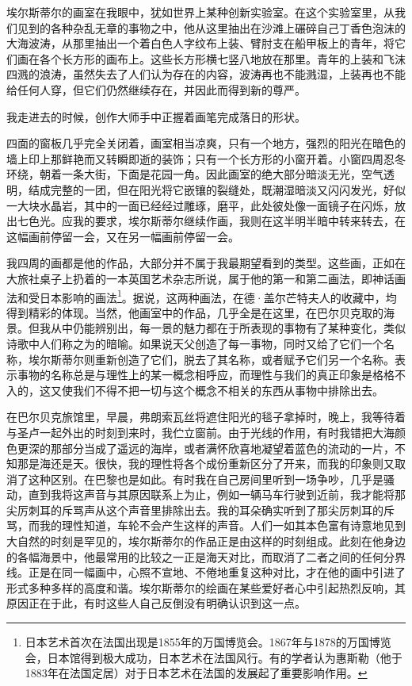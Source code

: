 \par 埃尔斯蒂尔的画室在我眼中，犹如世界上某种创新实验室。在这个实验室里，从我们见到的各种杂乱无章的事物之中，他从这里抽出在沙滩上碾碎自己丁香色泡沫的大海波涛，从那里抽出一个着白色人字纹布上装、臂肘支在船甲板上的青年，将它们画在各个长方形的画布上。这些长方形横七竖八地放在那里。青年的上装和飞沫四溅的浪涛，虽然失去了人们认为存在的内容，波涛再也不能溅湿，上装再也不能给任何人穿，但它们仍然继续存在，并因此而得到新的尊严。
\par 我走进去的时候，创作大师手中正握着画笔完成落日的形状。
\par 四面的窗板几乎完全关闭着，画室相当凉爽，只有一个地方，强烈的阳光在暗色的墙上印上那鲜艳而又转瞬即逝的装饰；只有一个长方形的小窗开着。小窗四周忍冬环绕，朝着一条大街，下面是花园一角。因此画室的绝大部分暗淡无光，空气透明，结成完整的一团，但在阳光将它嵌镶的裂缝处，既潮湿暗淡又闪闪发光，好似一大块水晶岩，其中的一面已经经过雕琢，磨平，此处彼处像一面镜子在闪烁，放出七色光。应我的要求，埃尔斯蒂尔继续作画，我则在这半明半暗中转来转去，在这幅画前停留一会，又在另一幅画前停留一会。
\par 我四周的画都是他的作品，大部分并不属于我最期望看到的类型。这些画，正如在大旅社桌子上扔着的一本英国艺术杂志所说，属于他的第一和第二画法，即神话画法和受日本影响的画法\footnote{日本艺术首次在法国出现是1855年的万国博览会。1867年与1878的万国博览会，日本馆得到极大成功，日本艺术在法国风行。有的学者认为惠斯勒（他于1883年在法国定居）对于日本艺术在法国的发展起了重要影响作用。}。据说，这两种画法，在德·盖尔芒特夫人的收藏中，均得到精彩的体现。当然，他画室中的作品，几乎全是在这里，在巴尔贝克取的海景。但我从中仍能辨别出，每一景的魅力都在于所表现的事物有了某种变化，类似诗歌中人们称之为的暗喻。如果说天父创造了每一事物，同时又给了它们一个名称，埃尔斯蒂尔则重新创造了它们，脱去了其名称，或者赋予它们另一个名称。表示事物的名称总是与理性上的某一概念相呼应，而理性与我们的真正印象是格格不入的，这又使我们不得不把一切与这个概念不相关的东西从事物中排除出去。
\par 在巴尔贝克旅馆里，早晨，弗朗索瓦丝将遮住阳光的毯子拿掉时，晚上，我等待着与圣卢一起外出的时刻到来时，我伫立窗前。由于光线的作用，有时我错把大海颜色更深的那部分当成了遥远的海岸，或者满怀欣喜地凝望着蓝色的流动的一片，不知那是海还是天。很快，我的理性将各个成份重新区分了开来，而我的印象则又取消了这种区别。在巴黎也是如此。有时我在自己房间里听到一场争吵，几乎是骚动，直到我将这声音与其原因联系上为止，例如一辆马车行驶到近前，我才能将那尖厉刺耳的斥骂声从这个声音里排除出去。我的耳朵确实听到了那尖厉刺耳的斥骂，而我的理性知道，车轮不会产生这样的声音。人们一如其本色富有诗意地见到大自然的时刻是罕见的，埃尔斯蒂尔的作品正是由这样的时刻组成。此刻在他身边的各幅海景中，他最常用的比较之一正是海天对比，而取消了二者之间的任何分界线。正是在同一幅画中，心照不宣地、不倦地重复这种对比，才在他的画中引进了形式多种多样的高度和谐。埃尔斯蒂尔的绘画在某些爱好者心中引起热烈反响，其原因正在于此，有时这些人自己反倒没有明确认识到这一点。
